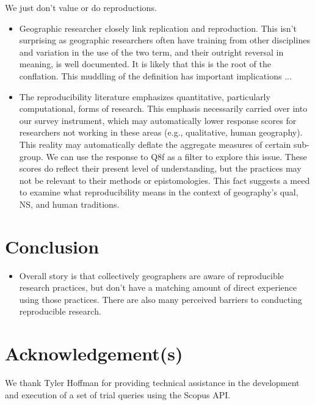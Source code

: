 \documentclass[]{interact}
\theoremstyle{plain}%
\theoremstyle{definition}
\theoremstyle{remark}
\begin{document}
We just don't value or do reproductions.

\begin{itemize}
    \item Geographic researcher closely link replication and reproduction. This isn't surprising as geographic researchers often have training from other disciplines and variation in the use of the two term, and their outright reversal in meaning, is well documented. It is likely that this is the root of the conflation. This muddling of the definition has important implications ...
    \item The reproducibility literature emphasizes quantitative, particularly computational, forms of research. This emphasis necessarily carried over into our survey instrument, which may automatically lower response scores for researchers not working in these areas (e.g., qualitative, human geography). This reality may automatically deflate the aggregate measures of certain sub-group. We can use the response to Q8f as a filter to explore this issue. These scores do reflect their present level of understanding, but the practices may not be relevant to their methods or epistomologies. This fact suggests a meed to examine what reproducibility means in the context of geography's qual, NS, and human traditions.
\end{itemize}

\section*{Conclusion}

\begin{itemize}
    \item Overall story is that collectively geographers are aware of reproducible research practices, but don't have a matching amount of direct experience using those practices. There are also many perceived barriers to conducting reproducible research.
\end{itemize}

\theendnotes


\section*{Acknowledgement(s)}
We thank Tyler Hoffman for providing technical assistance in the development and execution of a set of trial queries using the Scopus API.
\end{document}
